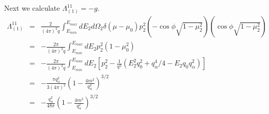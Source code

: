 \documentclass[12pt,letter]{article}
\begin{document}
Next we calculate $\Lambda_{(1)}^{11} = -g$.  
\begin{eqnarray*}
\Lambda_{(1)}^{11} &=& \frac{2}{(4 \pi)^2 q}\int_{E_{min}}^{E_{max}} dE_2 
d\Omega_2 \delta(\mu-\mu_0) p^2_2 
(-\cos \phi \sqrt{1-\mu_2^2})(\cos \phi \sqrt{1-\mu_2^2}) \\
&=& -\frac{2 \pi}{(4 \pi)^2 q}\int_{E_{min}}^{E_{max}} dE_2 
p^2_2(1-\mu_0^2) \\
&=& -\frac{2 \pi}{(4 \pi)^2 q}\int_{E_{min}}^{E_{max}} dE_2 
\left[p^2_2 - \frac{1}{q^2} 
\left(E_2^2 q_0^2 + q_\alpha^4/4 - E_2 q_0 q_\alpha^2\right) \right] \\
&=& -\frac{\pi q_\alpha^2}{3(4 \pi)^2}
\left(1 - \frac{4m^2}{q_\alpha^2}\right)^{3/2} \\
&=& -\frac{q_\alpha^2}{48 \pi}
\left(1 - \frac{4m^2}{q_\alpha^2}\right)^{3/2}
\end{eqnarray*}
\end{document}
